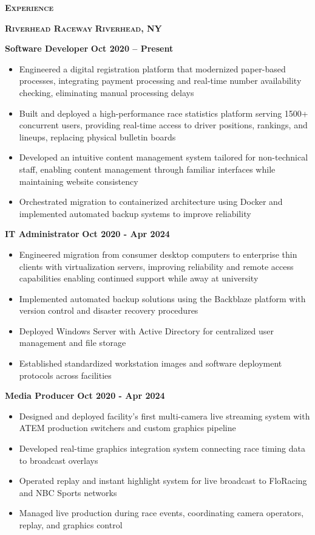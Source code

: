 \documentclass{article}
\newlength{\sectspaceabove}
\newlength{\sectspacebelow}
\newcommand{\textscbf}[1]{\textbf{\textsc{#1}}}
\newcommand{\resumesection}[1]{%
    \vspace{\sectspaceabove}%
    \begin{center}
        \textscbf{#1}
    \end{center}%
    \vspace{\sectspacebelow}%
}
\begin{document}
\resumesection{Experience}

\textscbf{Riverhead Raceway} \hfill \textscbf{Riverhead, NY}

\textbf{Software Developer} \hfill \textbf{Oct 2020 – Present}
\begin{itemize}[noitemsep,topsep=2pt]
	\item Engineered a digital registration platform that modernized paper-based processes, integrating payment processing and real-time number availability checking, eliminating manual processing delays
	\item Built and deployed a high-performance race statistics platform serving 1500+ concurrent users, providing real-time access to driver positions, rankings, and lineups, replacing physical bulletin boards
	\item Developed an intuitive content management system tailored for non-technical staff, enabling content management through familiar interfaces while maintaining website consistency
	\item Orchestrated migration to containerized architecture using Docker and implemented automated backup systems to improve reliability
\end{itemize}

\textbf{IT Administrator} \hfill \textbf{Oct 2020 - Apr 2024}
\begin{itemize}[noitemsep,topsep=2pt]
	\item Engineered migration from consumer desktop computers to enterprise thin clients with virtualization servers, improving reliability and remote access capabilities enabling continued support while away at university
	\item Implemented automated backup solutions using the Backblaze platform with version control and disaster recovery procedures
	\item Deployed Windows Server with Active Directory for centralized user management and file storage
	\item Established standardized workstation images and software deployment protocols across facilities
\end{itemize}

\textbf{Media Producer} \hfill \textbf{Oct 2020 - Apr 2024}
\begin{itemize}[noitemsep,topsep=2pt]
	\item Designed and deployed facility's first multi-camera live streaming system with ATEM production switchers and custom graphics pipeline
	\item Developed real-time graphics integration system connecting race timing data to broadcast overlays
	\item Operated replay and instant highlight system for live broadcast to FloRacing and NBC Sports networks
	\item Managed live production during race events, coordinating camera operators, replay, and graphics control
\end{itemize}
\end{document}
